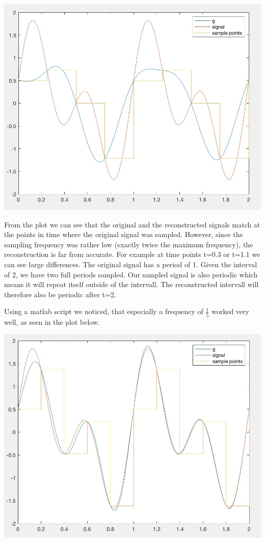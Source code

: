 \documentclass[12pt]{article}
\begin{document}
\begin{enumerate}[a)]
\begin{centering}
\includegraphics[scale = 0.3]{figures/sinc4}\\
\end{centering}

From the plot we can see that the original and the reconstructed signals match at the points in time where the original signal was sampled. However, since the sampling frequency was rather low (exactly twice the maximum frequency), the reconstruction is far from accurate. For example at time points t=0.3 or t=1.1 we can see large differences. The original signal has a period of 1. Given the interval of 2, we have two full  periods sampled. Our sampled signal is also periodic which means it will repeat itself outside of the intervall. The reconstructed intervall will therefore also be periodic after t=2.

Using a matlab script we noticed, that especially a frequency of $\frac{1}{5}$ worked very well, as seen in the plot below.\\

\begin{centering}
\includegraphics[scale = 0.3]{figures/sinc5}\\
\end{centering}



\end{enumerate}
\end{document}
